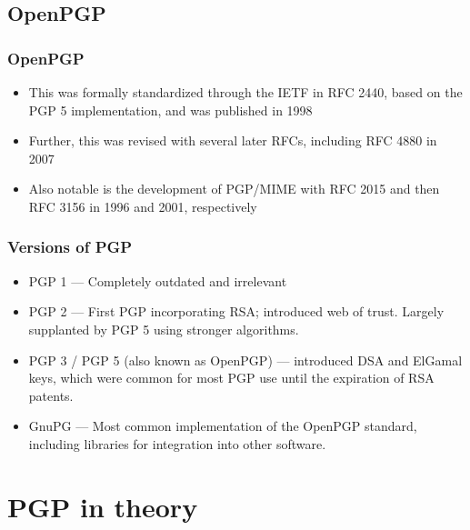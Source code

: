 \documentclass[aspectratio=1610,bigger,utf8]{beamer}
\begin{document}
\subsection{OpenPGP}
\begin{frame}
	\frametitle{OpenPGP}
	\begin{itemize}
		\item This was formally standardized through the IETF in
			\alert{RFC 2440}, based on the PGP 5 implementation,
			and was published in 1998
		\item Further, this was revised with several later RFCs,
			including \alert{RFC 4880} in 2007
		\item Also notable is the development of PGP/MIME with
			\alert{RFC 2015} and then \alert{RFC 3156} in 1996 and
			2001, respectively
	\end{itemize}
\end{frame}
\begin{frame}
	\frametitle{Versions of PGP}
	\begin{itemize}
		\item PGP 1 --- Completely outdated and irrelevant
		\item PGP 2 --- First PGP incorporating RSA; introduced web of
			trust. Largely supplanted by PGP 5 using stronger
			algorithms.
		\item PGP 3 / PGP 5 (also known as OpenPGP) --- introduced DSA
			and ElGamal keys, which were common for most PGP use
			until the expiration of RSA patents.
		\item GnuPG --- Most common implementation of the OpenPGP
			standard, including libraries for integration into
			other software.
	\end{itemize}
\end{frame}

\section{PGP in theory}
\end{document}
